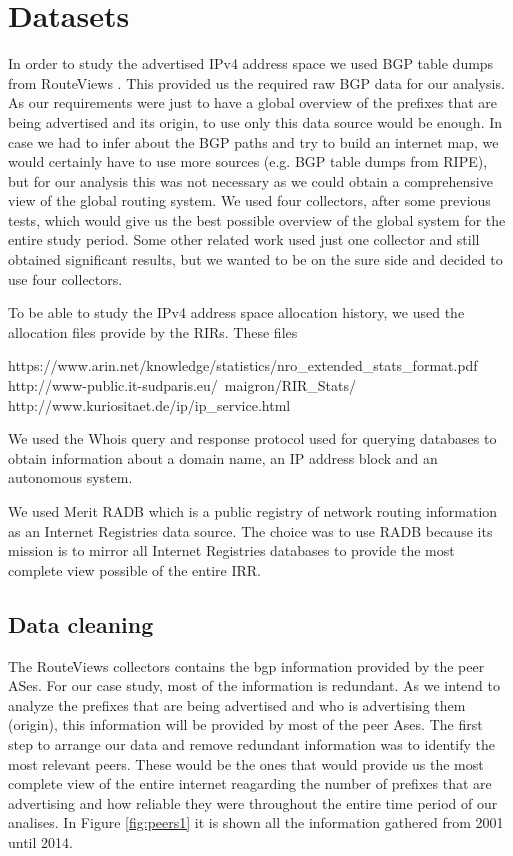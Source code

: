 \documentclass[11pt,a4paper]{scrreprt}
\begin{document}
\chapter{Datasets}

In order to study the advertised IPv4 address space we used BGP table dumps from RouteViews \cite{RouteViews}. This provided us the required raw BGP data for our analysis. As our requirements were just to have a global overview of the prefixes that are being advertised and its origin, to use only this data source would be enough. In case we had to infer about the BGP paths and try to build an internet map, we would certainly have to use more sources (e.g. BGP table dumps from RIPE), but for our analysis this was not necessary as we could obtain a comprehensive view of the global routing system.
We used four collectors, after some previous tests, which would give us the best possible overview of the global system for the entire study period. Some other related work \cite{Address_Space_Deaggregation} used just one collector and still obtained significant results, but we wanted to be on the sure side and decided to use four collectors. 

To be able to study the IPv4 address space allocation history, we used the allocation files \cite{Potaroo} provide by the RIRs. These files 


https://www.arin.net/knowledge/statistics/nro\_extended\_stats\_format.pdf
http://www-public.it-sudparis.eu/~maigron/RIR\_Stats/
http://www.kuriositaet.de/ip/ip\_service.html



We used the Whois \cite{Whois} query and response protocol used for querying databases to obtain information about a domain name, an IP address block and an autonomous system. 

We used Merit RADB \cite{RADB} which is a public registry of network routing information as an Internet Registries data source. The choice was to use RADB because its mission is to mirror all Internet Registries  databases to provide the most complete view possible of the entire IRR. 

\section{Data cleaning}
The RouteViews collectors contains the bgp information provided by the peer ASes. For our case study, most of the information is redundant. As we intend to analyze the prefixes that are being advertised and who is advertising them (origin), this information will be provided by most of the peer Ases. The first step to arrange our data and remove redundant information was to identify the most relevant peers. These would be the ones that would provide us the most complete view of the entire internet reagarding the number of prefixes that are advertising and how reliable they were throughout the entire time period of our analises. In Figure \ref{fig:peers1} it is shown all the information gathered from 2001 until 2014. 
\end{document}
